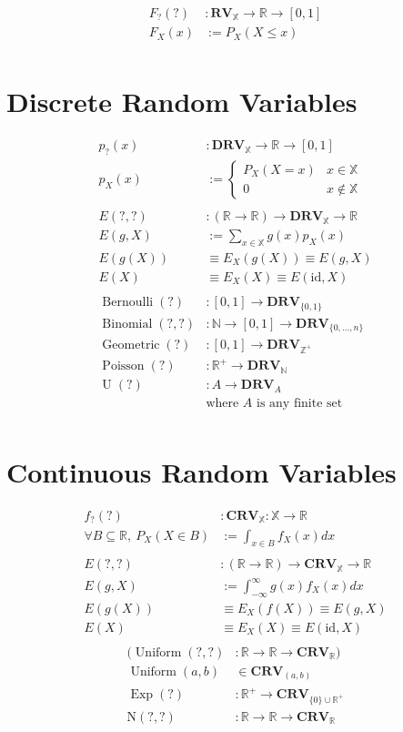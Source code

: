 \documentclass[12pt]{article}
\theoremstyle{definition}
\newcommand{\R}{\mathbb{R}}
\newcommand{\N}{\mathbb{N}}
\newcommand{\X}{\mathbb{X}}
\newcommand{\Z}{\mathbb{Z}}
\newcommand{\RV}{\mathbf{RV}}
\newcommand{\DRV}{\mathbf{DRV}}
\newcommand{\CRV}{\mathbf{CRV}}
\DeclareMathOperator{\Bernoulli}{Bernoulli}
\DeclareMathOperator{\Binomial}{Binomial}
\DeclareMathOperator{\Geometric}{Geometric}
\DeclareMathOperator{\Poisson}{Poisson}
\DeclareMathOperator{\U}{U}
\DeclareMathOperator{\Uniform}{Uniform}
\DeclareMathOperator{\Exp}{Exp}
\begin{document}
\begin{align*}
  F_{?}(?) &: \RV_\X \to \R \to [0, 1]\\
  F_X(x) &:= P_X(X \leq x)\\
\end{align*}

\section{Discrete Random Variables}

\begin{align*}
  p_{?}(x) &: \DRV_\X \to \R \to [0, 1]\\
  p_X(x) &:= \begin{cases}P_X(X = x) & x \in \X \\ 0 & x \notin \X\end{cases}\\
  \\
  E(?, ?) &: (\R \to \R) \to \DRV_\X \to \R\\
  E(g, X) &:= \sum_{x \in \X}g(x)p_X(x)\\
  E(g(X)) &\equiv E_X(g(X)) \equiv E(g, X)\\
  E(X) &\equiv E_X(X) \equiv E(\text{id}, X)\\
  \\
  \Bernoulli(?) &: [0, 1] \to \DRV_{\{0, 1\}}\\
  \Binomial(?, ?) &: \N \to [0, 1] \to \DRV_{\{0, \ldots, n\}}\\
  \Geometric(?) &: [0, 1] \to \DRV_{\Z^+}\\
  \Poisson(?) &: \R^+ \to \DRV_{\N}\\
  \U(?) &: A \to \DRV_A\\
     &\text{where $A$ is any finite set}\\
\end{align*}

\section{Continuous Random Variables}

\begin{align*}
  f_{?}(?) &: \CRV_\X : \X \to \R\\
  \forall B \subseteq \R,\ P_X(X \in B) &:= \int_{x \in B}f_X(x)dx\\
  \\
  E(?, ?) &: (\R \to \R) \to \CRV_\X \to \R\\
  E(g, X) &:= \int_{-\infty}^{\infty}g(x)f_X(x)dx\\
  E(g(X)) &\equiv E_X(f(X)) \equiv E(g, X)\\
  E(X) &\equiv E_X(X) \equiv E(\text{id}, X)\\
\end{align*}
\begin{align*}
  (\Uniform(?, ?) &: \R \to \R \to \CRV_\R)\\
  \Uniform(a, b) &\in \CRV_{(a, b)}\\
  \Exp(?) &: \R^+ \to \CRV_{\{0\} \cup \R^+}\\
  \text{N}(?, ?) &: \R \to \R \to \CRV_\R
\end{align*}
\end{document}
